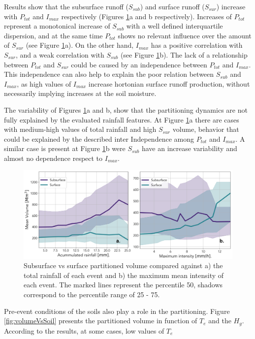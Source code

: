 \documentclass[preprint,12pt]{elsarticle}
\begin{document}
Results show that the subsurface runoff ($S_{sub}$) and surface runoff ($S_{sur}$) increase with $P_{tot}$ and $I_{max}$ respectively (Figures \ref{fig:volumeVsRainfall}a and b respectively).  Increases of $P_{tot}$ represent a monotonical increase of $S_{sub}$ with a well defined interquartile dispersion, and at the same time $P_{tot}$ shows no relevant influence over the amount of $S_{sur}$ (see Figure \ref{fig:volumeVsRainfall}a).  On the other hand, $I_{max}$ has a positive correlation with $S_{sur}$, and a weak correlation with $S_{sub}$ (see Figure \ref{fig:volumeVsRainfall}b). The lack of a relationship between  $P_{tot}$ and $S_{sur}$ could be caused by an independence between $P_{tot}$ and $I_{max}$.   This independence can also help to explain the poor relation between $S_{sub}$ and $I_{max}$, as high values of $I_{max}$ increase hortonian surface runoff production, without necessarily implying increases at the soil moisture. 

The variability of Figures \ref{fig:volumeVsRainfall}a and b, show that the partitioning dynamics are not fully explained by the evaluated rainfall features.  At Figure \ref{fig:volumeVsRainfall}a there are cases with medium-high values of total rainfall and high $S_{sur}$ volume, behavior that could be explained by the described inter Independence among $P_{tot}$ and $I_{max}$.  A similar case is present at Figure \ref{fig:volumeVsRainfall}b were $S_{sub}$ have an increase variability and almost no dependence respect to $I_{max}$.\\

\begin{figure}[H]
    \centering
    \includegraphics[width=14cm]{Figuras/MeanVolumeVsRainfall}
    \caption{Subsurface vs surface partitioned volume compared against a) the total rainfall of each event and b) the maximum mean intensity of each event.  The marked lines represent the percentile 50, shadows correspond to the percentile range of 25 - 75.}
    \label{fig:volumeVsRainfall}
\end{figure}
Pre-event conditions of the soils also play a role in the partitioning.  Figure \ref{fig:volumeVsSoil} presents the partitioned volume in function of $T_e$ and the $H_g$.  According to the results, at some cases, low values of $T_{e}$
\end{document}
